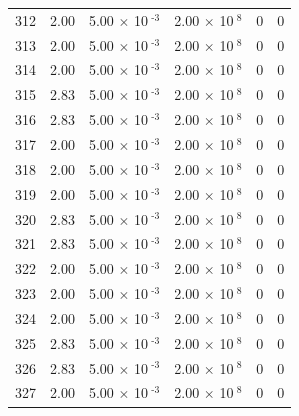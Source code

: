 \documentclass[a4paper,11pt]{article}
\begin{document}
\begin{center}
\begin{longtable}{|R{1.5cm}|R{2.4cm}|R{2.4cm}|R{2.4cm}|R{2.4cm}|R{2.4cm}|}
  312 &   2.00  &         5.00 $\times$ 10$^{\text{          -3}}$  &         2.00 $\times$ 10$^{\text{           8}}$  & 0  & 0 \\
  313 &   2.00  &         5.00 $\times$ 10$^{\text{          -3}}$  &         2.00 $\times$ 10$^{\text{           8}}$  & 0  & 0 \\
  314 &   2.00  &         5.00 $\times$ 10$^{\text{          -3}}$  &         2.00 $\times$ 10$^{\text{           8}}$  & 0  & 0 \\
  315 &   2.83  &         5.00 $\times$ 10$^{\text{          -3}}$  &         2.00 $\times$ 10$^{\text{           8}}$  & 0  & 0 \\
  316 &   2.83  &         5.00 $\times$ 10$^{\text{          -3}}$  &         2.00 $\times$ 10$^{\text{           8}}$  & 0  & 0 \\
  317 &   2.00  &         5.00 $\times$ 10$^{\text{          -3}}$  &         2.00 $\times$ 10$^{\text{           8}}$  & 0  & 0 \\
  318 &   2.00  &         5.00 $\times$ 10$^{\text{          -3}}$  &         2.00 $\times$ 10$^{\text{           8}}$  & 0  & 0 \\
  319 &   2.00  &         5.00 $\times$ 10$^{\text{          -3}}$  &         2.00 $\times$ 10$^{\text{           8}}$  & 0  & 0 \\
  320 &   2.83  &         5.00 $\times$ 10$^{\text{          -3}}$  &         2.00 $\times$ 10$^{\text{           8}}$  & 0  & 0 \\
  321 &   2.83  &         5.00 $\times$ 10$^{\text{          -3}}$  &         2.00 $\times$ 10$^{\text{           8}}$  & 0  & 0 \\
  322 &   2.00  &         5.00 $\times$ 10$^{\text{          -3}}$  &         2.00 $\times$ 10$^{\text{           8}}$  & 0  & 0 \\
  323 &   2.00  &         5.00 $\times$ 10$^{\text{          -3}}$  &         2.00 $\times$ 10$^{\text{           8}}$  & 0  & 0 \\
  324 &   2.00  &         5.00 $\times$ 10$^{\text{          -3}}$  &         2.00 $\times$ 10$^{\text{           8}}$  & 0  & 0 \\
  325 &   2.83  &         5.00 $\times$ 10$^{\text{          -3}}$  &         2.00 $\times$ 10$^{\text{           8}}$  & 0  & 0 \\
  326 &   2.83  &         5.00 $\times$ 10$^{\text{          -3}}$  &         2.00 $\times$ 10$^{\text{           8}}$  & 0  & 0 \\
  327 &   2.00  &         5.00 $\times$ 10$^{\text{          -3}}$  &         2.00 $\times$ 10$^{\text{           8}}$  & 0  & 0 \\

\end{longtable}
\end{center}
\end{document}

